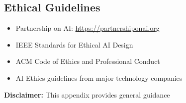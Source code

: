 \subsection{Ethical Guidelines}
\begin{itemize}
\item Partnership on AI: \url{https://partnershiponai.org}
\item IEEE Standards for Ethical AI Design
\item ACM Code of Ethics and Professional Conduct
\item AI Ethics guidelines from major technology companies
\end{itemize}

\textbf{Disclaimer:} This appendix provides general guidance